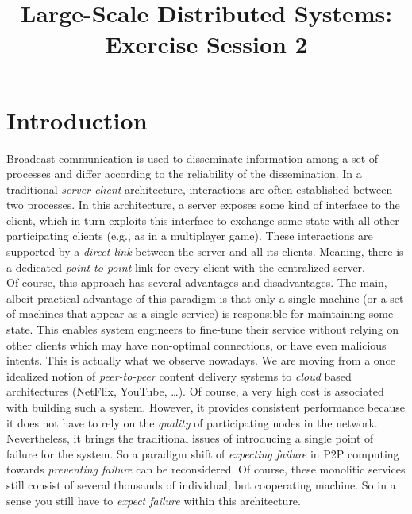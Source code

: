 

\title{Large-Scale Distributed Systems: Exercise Session 2}
\maketitle

\section{Introduction}
\label{sec:introduction}

Broadcast communication is used to disseminate information among a set of processes and differ according to the reliability of the dissemination.  In a traditional \emph{server-client} architecture, interactions are often established between two processes. In this architecture, a server exposes some kind of interface to the client, which in turn exploits this interface to exchange some state with all other participating clients (e.g., as in a multiplayer game). These interactions are supported by a \emph{direct link} between the server and all its clients. Meaning, there is a dedicated \emph{point-to-point} link for every client with the centralized server.\\

Of course, this approach has several advantages and disadvantages. The main, albeit practical advantage of this paradigm is that only a single machine (or a set of machines that appear as a single service) is responsible for maintaining some state. This enables system engineers to fine-tune their service without relying on other clients which may have non-optimal connections, or have even malicious intents. This is actually what we observe nowadays. We are moving from a once idealized notion of \emph{peer-to-peer} content delivery systems to \emph{cloud} based architectures (NetFlix, YouTube, \ldots). Of course, a very high cost is associated with building such a system. However, it provides consistent performance because it does not have to rely on the \emph{quality} of participating nodes in the network. Nevertheless, it brings the traditional issues of introducing a single point of failure for the system. So a paradigm shift of \emph{expecting failure} in P2P computing towards \emph{preventing failure} can be reconsidered. Of course, these monolitic services still consist of several thousands of individual, but cooperating machine. So in a sense you still have to \emph{expect failure} within this architecture.\\

